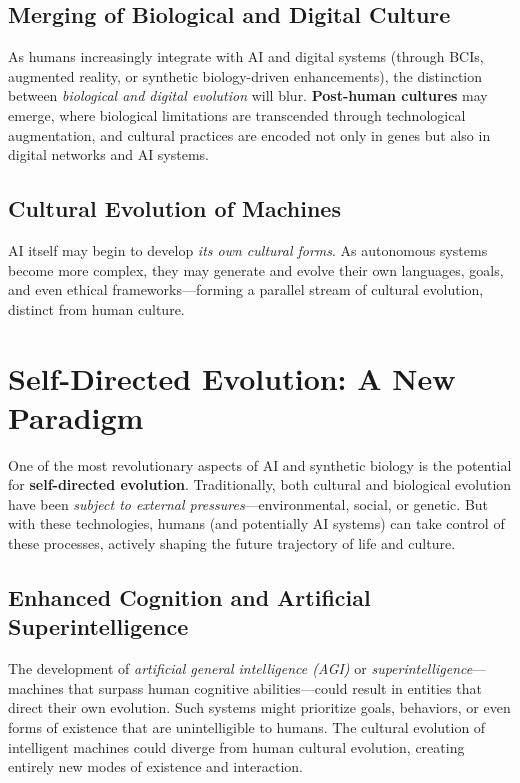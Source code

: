 \documentclass[10pt,titlepage]{book}
\begin{document}
\subsection{Merging of Biological and Digital Culture}

As humans increasingly integrate with AI and digital systems (through BCIs, augmented reality, or synthetic biology-driven enhancements), the distinction between \textit{biological and digital evolution} will blur. \textbf{Post-human cultures} may emerge, where biological limitations are transcended through technological augmentation, and cultural practices are encoded not only in genes but also in digital networks and AI systems.

\subsection{Cultural Evolution of Machines}

AI itself may begin to develop \textit{its own cultural forms}. As autonomous systems become more complex, they may generate and evolve their own languages, goals, and even ethical frameworks—forming a parallel stream of cultural evolution, distinct from human culture.

\section{Self-Directed Evolution: A New Paradigm}

One of the most revolutionary aspects of AI and synthetic biology is the potential for \textbf{self-directed evolution}. Traditionally, both cultural and biological evolution have been \textit{subject to external pressures}—environmental, social, or genetic. But with these technologies, humans (and potentially AI systems) can take control of these processes, actively shaping the future trajectory of life and culture.

\subsection{Enhanced Cognition and Artificial Superintelligence}

The development of \textit{artificial general intelligence (AGI)} or \textit{superintelligence}—machines that surpass human cognitive abilities—could result in entities that direct their own evolution. Such systems might prioritize goals, behaviors, or even forms of existence that are unintelligible to humans. The cultural evolution of intelligent machines could diverge from human cultural evolution, creating entirely new modes of existence and interaction.
\end{document}
